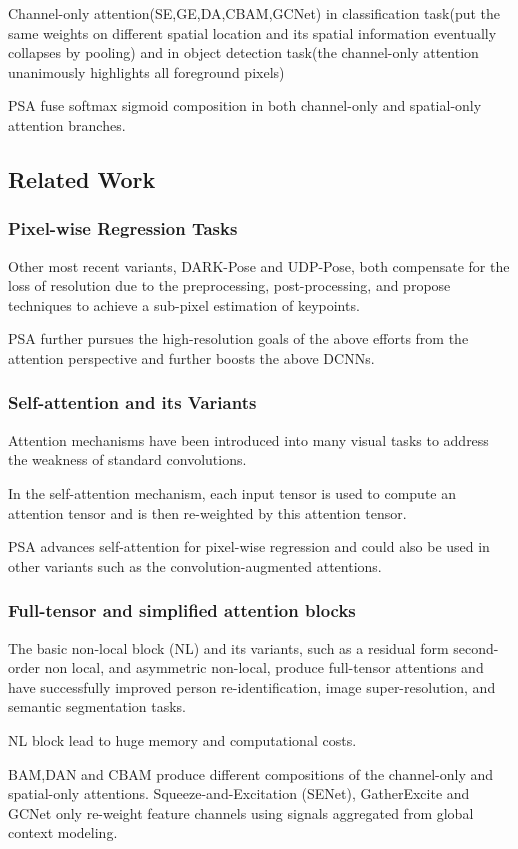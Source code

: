 \documentclass[11pt]{article}
\begin{document}
Channel-only attention(SE,GE,DA,CBAM,GCNet) in classification task(put the same weights on different spatial location and its spatial information eventually collapses by pooling) and in object detection task(the channel-only attention unanimously highlights all foreground pixels)

PSA fuse softmax sigmoid composition in both channel-only and spatial-only attention branches.
\subsection{Related Work}
\subsubsection{Pixel-wise Regression Tasks}
Other most recent variants, DARK-Pose and UDP-Pose, both compensate for the loss of resolution due to the preprocessing, post-processing, and propose techniques to achieve a sub-pixel estimation of keypoints.

PSA further pursues the high-resolution goals of the above efforts from the attention perspective and further boosts the above DCNNs.
\subsubsection{Self-attention and its Variants}
Attention mechanisms have been introduced into many visual tasks to address the weakness of standard convolutions.

In the self-attention mechanism, each input tensor is used to compute an attention tensor and is then re-weighted by this attention tensor.

PSA advances self-attention for pixel-wise regression and could also be used in other variants such as the convolution-augmented attentions.
\subsubsection{Full-tensor and simplified attention blocks}
The basic non-local block (NL) and its variants, such as a residual form second-order non local, and asymmetric non-local, produce full-tensor attentions and have successfully improved person re-identification, image super-resolution, and semantic segmentation tasks.

NL block lead to huge memory and computational costs.

BAM,DAN and CBAM produce different compositions of the channel-only and spatial-only attentions. Squeeze-and-Excitation (SENet), GatherExcite and GCNet only re-weight feature channels using signals aggregated from global context modeling.
\end{document}
